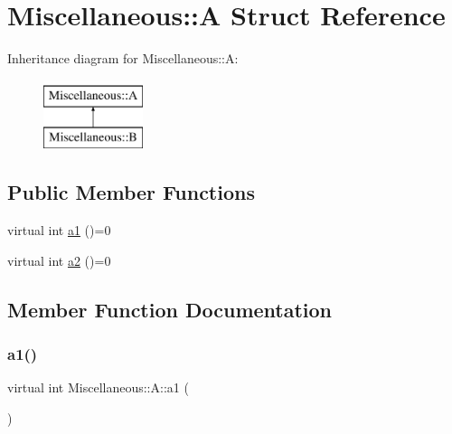 \hypertarget{structMiscellaneous_1_1A}{}\section{Miscellaneous\+::A Struct Reference}
\label{structMiscellaneous_1_1A}
Inheritance diagram for Miscellaneous\+::A\+:\begin{figure}[H]
\begin{center}
\leavevmode
\includegraphics[height=2.000000cm]{structMiscellaneous_1_1A}
\end{center}
\end{figure}
\subsection*{Public Member Functions}
\begin{DoxyCompactItemize}
\item 
virtual int \mbox{\hyperlink{structMiscellaneous_1_1A_a6cb353e23d8ae10577ddc7620c96fd1c}{a1}} ()=0
\item 
virtual int \mbox{\hyperlink{structMiscellaneous_1_1A_acf6f7d1dac9655585c0780fc52e41c36}{a2}} ()=0
\end{DoxyCompactItemize}


\subsection{Member Function Documentation}
\mbox{\label{structMiscellaneous_1_1A_a6cb353e23d8ae10577ddc7620c96fd1c}} 
\subsubsection{\texorpdfstring{a1()}{a1()}}
{\footnotesize\ttfamily virtual int Miscellaneous\+::\+A\+::a1 (\begin{DoxyParamCaption}{ }\end{DoxyParamCaption})\hspace{0.3cm}{\ttfamily [pure virtual]}}

\mbox{\label{structMiscellaneous_1_1A_acf6f7d1dac9655585c0780fc52e41c36}} 
